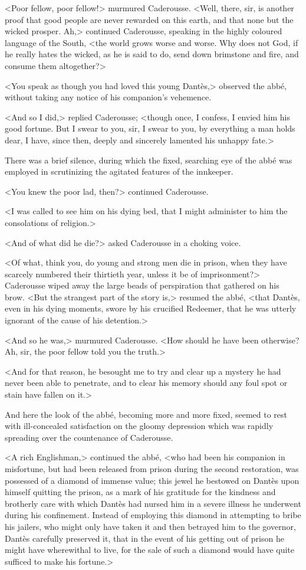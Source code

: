  <Poor fellow, poor fellow!> murmured Caderousse. <Well, there, sir, is another proof that good people are never rewarded on this earth, and that none but the wicked prosper. Ah,> continued Caderousse, speaking in the highly coloured language of the South, <the world grows worse and worse. Why does not God, if he really hates the wicked, as he is said to do, send down brimstone and fire, and consume them altogether?> 

 <You speak as though you had loved this young Dantès,> observed the abbé, without taking any notice of his companion's vehemence. 

 <And so I did,> replied Caderousse; <though once, I confess, I envied him his good fortune. But I swear to you, sir, I swear to you, by everything a man holds dear, I have, since then, deeply and sincerely lamented his unhappy fate.> 

 There was a brief silence, during which the fixed, searching eye of the abbé was employed in scrutinizing the agitated features of the innkeeper. 

 <You knew the poor lad, then?> continued Caderousse. 

 <I was called to see him on his dying bed, that I might administer to him the consolations of religion.> 

 <And of what did he die?> asked Caderousse in a choking voice. 

 <Of what, think you, do young and strong men die in prison, when they have scarcely numbered their thirtieth year, unless it be of imprisonment?> Caderousse wiped away the large beads of perspiration that gathered on his brow.  <But the strangest part of the story is,> resumed the abbé, <that Dantès, even in his dying moments, swore by his crucified Redeemer, that he was utterly ignorant of the cause of his detention.> 

 <And so he was,> murmured Caderousse. <How should he have been otherwise? Ah, sir, the poor fellow told you the truth.> 

 <And for that reason, he besought me to try and clear up a mystery he had never been able to penetrate, and to clear his memory should any foul spot or stain have fallen on it.> 

 And here the look of the abbé, becoming more and more fixed, seemed to rest with ill-concealed satisfaction on the gloomy depression which was rapidly spreading over the countenance of Caderousse. 

 <A rich Englishman,> continued the abbé, <who had been his companion in misfortune, but had been released from prison during the second restoration, was possessed of a diamond of immense value; this jewel he bestowed on Dantès upon himself quitting the prison, as a mark of his gratitude for the kindness and brotherly care with which Dantès had nursed him in a severe illness he underwent during his confinement. Instead of employing this diamond in attempting to bribe his jailers, who might only have taken it and then betrayed him to the governor, Dantès carefully preserved it, that in the event of his getting out of prison he might have wherewithal to live, for the sale of such a diamond would have quite sufficed to make his fortune.> 

